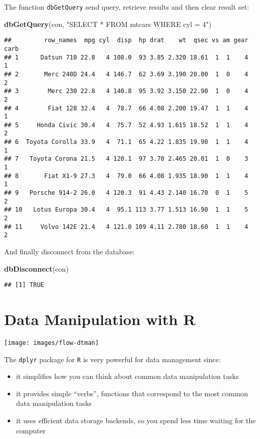 \documentclass[]{book}
\newenvironment{Shaded}{\begin{snugshade}}{\end{snugshade}}
\newcommand{\KeywordTok}[1]{\textcolor[rgb]{0.13,0.29,0.53}{\textbf{{#1}}}}
\newcommand{\StringTok}[1]{\textcolor[rgb]{0.31,0.60,0.02}{{#1}}}
\newcommand{\NormalTok}[1]{{#1}}
\providecommand{\tightlist}{%
  \setlength{\itemsep}{0pt}\setlength{\parskip}{0pt}}
\def\tightlist{}
\begin{document}
The function \texttt{dbGetQuery} send query, retrieve results and then
clear result set:

\begin{Shaded}
\begin{Highlighting}[]
\KeywordTok{dbGetQuery}\NormalTok{(con, }\StringTok{"SELECT * FROM mtcars WHERE cyl = 4"}\NormalTok{)}
\end{Highlighting}
\end{Shaded}

\begin{verbatim}
##         row_names  mpg cyl  disp  hp drat    wt  qsec vs am gear carb
## 1      Datsun 710 22.8   4 108.0  93 3.85 2.320 18.61  1  1    4    1
## 2       Merc 240D 24.4   4 146.7  62 3.69 3.190 20.00  1  0    4    2
## 3        Merc 230 22.8   4 140.8  95 3.92 3.150 22.90  1  0    4    2
## 4        Fiat 128 32.4   4  78.7  66 4.08 2.200 19.47  1  1    4    1
## 5     Honda Civic 30.4   4  75.7  52 4.93 1.615 18.52  1  1    4    2
## 6  Toyota Corolla 33.9   4  71.1  65 4.22 1.835 19.90  1  1    4    1
## 7   Toyota Corona 21.5   4 120.1  97 3.70 2.465 20.01  1  0    3    1
## 8       Fiat X1-9 27.3   4  79.0  66 4.08 1.935 18.90  1  1    4    1
## 9   Porsche 914-2 26.0   4 120.3  91 4.43 2.140 16.70  0  1    5    2
## 10   Lotus Europa 30.4   4  95.1 113 3.77 1.513 16.90  1  1    5    2
## 11     Volvo 142E 21.4   4 121.0 109 4.11 2.780 18.60  1  1    4    2
\end{verbatim}

And finally disconnect from the database:

\begin{Shaded}
\begin{Highlighting}[]
\KeywordTok{dbDisconnect}\NormalTok{(con)}
\end{Highlighting}
\end{Shaded}

\begin{verbatim}
## [1] TRUE
\end{verbatim}

\chapter{Data Manipulation with R}\label{data-manipulation-with-r}

\texttt{[image: images/flow-dtman]}

The \texttt{dplyr} package for \texttt{R} is very powerful for data
management since:

\begin{itemize}
\tightlist
\item
  it simplifies how you can think about common data manipulation tasks
\item
  it provides simple ``verbs'', functions that correspond to the most
  common data manipulation tasks
\item
  it uses efficient data storage backends, so you spend less time
  waiting for the computer
\end{itemize}
\end{document}
